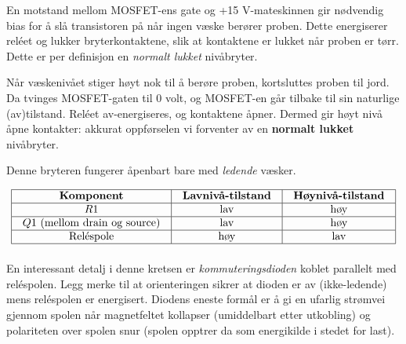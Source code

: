 \vskip 10pt

En motstand mellom MOSFET-ens gate og +15 V-mateskinnen gir nødvendig bias for å slå transistoren på når ingen væske berører proben. Dette energiserer reléet og lukker bryterkontaktene, slik at kontaktene er lukket når proben er tørr. Dette er per definisjon en {\it normalt lukket} nivåbryter.

\vskip 10pt

Når væskenivået stiger høyt nok til å berøre proben, kortsluttes proben til jord. Da tvinges MOSFET-gaten til 0 volt, og MOSFET-en går tilbake til sin naturlige (av)tilstand. Reléet av-energiseres, og kontaktene åpner. Dermed gir høyt nivå åpne kontakter: akkurat oppførselen vi forventer av en {\bf normalt lukket} nivåbryter.

\vskip 10pt

Denne bryteren fungerer åpenbart bare med {\it ledende} væsker.


$$\vbox{\offinterlineskip
\halign{\strut
\vrule \quad\hfil # \ \hfil & 
\vrule \quad\hfil # \ \hfil & 
\vrule \quad\hfil # \ \hfil \vrule \cr
\noalign{\hrule}
%
{\bf Komponent} & {\bf Lavnivå-tilstand} & {\bf Høynivå-tilstand} \cr
%
\noalign{\hrule}
%
$R1$ & lav & høy \cr
%
\noalign{\hrule}
%
$Q1$ (mellom drain og source) & lav & høy \cr
%
\noalign{\hrule}
%
Reléspole & høy & lav \cr
%
\noalign{\hrule}
} %
}$$ %

\vskip 10pt

En interessant detalj i denne kretsen er {\it kommuteringsdioden} koblet parallelt med reléspolen. Legg merke til at orienteringen sikrer at dioden er av (ikke-ledende) mens reléspolen er energisert. Diodens eneste formål er å gi en ufarlig strømvei gjennom spolen når magnetfeltet kollapser (umiddelbart etter utkobling) og polariteten over spolen snur (spolen opptrer da som energikilde i stedet for last).



